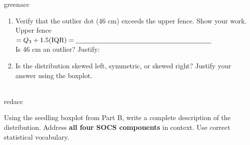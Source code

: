\documentclass[10pt]{article}
\begin{document}
\begin{blurbbox}{greenacc}
\begin{enumerate}[leftmargin=1.5em, itemsep=8pt]
  \item Verify that the outlier dot (46 cm) exceeds the upper fence.
        Show your work.\\[5pt]
        Upper fence $= Q_3 + 1.5(\text{IQR}) = \blank{7cm}$\\[4pt]
        Is 46 cm an outlier? \blank{2cm} \quad Justify: \blank{5cm}

  \item Is the distribution skewed left, symmetric, or skewed right?
        Justify your answer using the boxplot.\\[5pt]
        \writeline\\[1pt]\writeline

\end{enumerate}

\end{blurbbox}

\vspace{0.12in}

\begin{blurbbox}{redacc}
\small

Using the seedling boxplot from Part B, write a complete description of the
distribution. Address \textbf{all four SOCS components} in context.
Use correct statistical vocabulary.

\vspace{0.08in}
\writeline\\[1pt]\writeline\\[1pt]\writeline\\[1pt]
\writeline\\[1pt]\writeline\\[1pt]\writeline

\end{blurbbox}
\end{document}
